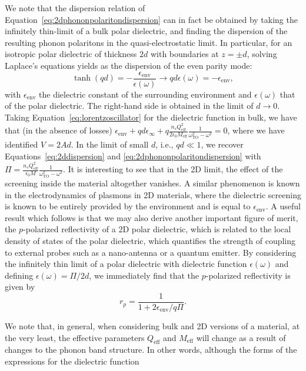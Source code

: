 \documentclass[aps,prb,twocolumn,
	groupedaddress,superscriptaddress,
	amsfonts,amssymb,amsmath,floatfix,
	citeautoscript]{revtex4-1}
\begin{document}
We note that the dispersion relation of Equation~\eqref{eq:2dphononpolaritondispersion} can in fact be obtained by taking the infinitely thin-limit of a bulk polar dielectric, and finding the dispersion of the resulting phonon polaritons in the quasi-electrostatic limit.
In particular, for an isotropic polar dielectric of thickness $2d$ with boundaries at $z=\pm d$, solving Laplace's equations yields as the dispersion of the even parity mode:
\begin{equation}\label{eq:thinfilmphononpolaritondispersion}
\tanh(qd) = -\frac{\epsilon_{\mathrm{env}}}{\epsilon(\omega)} \rightarrow qd\epsilon(\omega) = -\epsilon_{\mathrm{env}},
\end{equation}
with $\epsilon_{\mathrm{env}}$ the dielectric constant of the surrounding environment and $\epsilon(\omega)$ that of the polar dielectric.
The right-hand side is obtained in the limit of $d\rightarrow 0$.
Taking Equation~\eqref{eq:lorentzoscillator} for the dielectric function in bulk, we have that (in the absence of losses) $\epsilon_{\mathrm{env}} + qd\epsilon_{\infty} + q\frac{n_sQ_{\mathrm{eff}}^{2}}{2\epsilon_0 M_{\mathrm{eff}}}\frac{1}{\omega_{\mathrm{TO}}^2-\omega^2} = 0$, where we have identified $V = 2Ad$.
In the limit of small $d$, i.e., $qd \ll 1$, we recover Equations~\eqref{eq:2ddispersion} and \eqref{eq:2dphononpolaritondispersion} with $\Pi = \frac{n_sQ_{\mathrm{eff}}^{2}}{\epsilon_0 M}\frac{1}{\omega^2_{\mathrm{TO}}-\omega^2}$. It is interesting to see that in the 2D limit, the effect of the screening inside the material altogether vanishes. A similar phenomenon is known in the electrodynamics of plasmons in 2D materials, where the dielectric screening is known to be entirely provided by the environment and is equal to $\epsilon_{\mathrm{env}}$. A useful result which follows is that we may also derive another important figure of merit, the $p$-polarized reflectivity of a 2D polar dielectric, which is related to the local density of states of the polar dielectric, which quantifies the strength of coupling to external probes such as a nano-antenna or a quantum emitter.
By considering the infinitely thin limit of a polar dielectric with dielectric function $\epsilon(\omega)$ and defining $\epsilon(\omega) = \Pi/2d$, we immediately find that the $p$-polarized reflectivity is given by
\begin{equation}\label{eq:2dtmreflectivity}
r_p = \frac{1}{1+2\epsilon_{\mathrm{env}}/q\Pi}.
\end{equation}

We note that, in general, when considering bulk and 2D versions of a material, at the very least, the effective parameters $Q_{\mathrm{eff}}$ and $M_{\mathrm{eff}}$ will change as a result of changes to the phonon band structure. In other words, although the forms of the expressions for the dielectric function 
\end{document}
